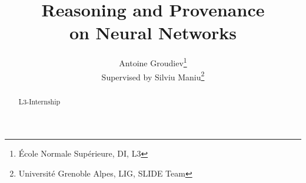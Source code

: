 \documentclass{../cs-classes/cs-classes}
\title{Reasoning and Provenance\\ on Neural Networks}
\author{Antoine Groudiev\thanks{École Normale Supérieure, DI, L3}\\Supervised by Silviu Maniu\thanks{Université Grenoble Alpes, LIG, SLIDE Team}}
\begin{document}
\begin{abstract}
    L3-Internship
\end{abstract}
\end{document}
